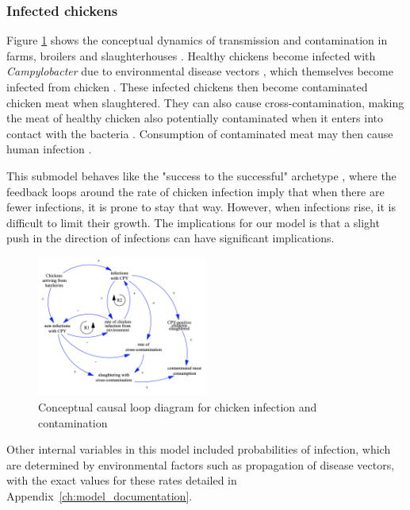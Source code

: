 \subsubsection*{Infected chickens}
Figure \ref{fig:transmission_submodel} shows the conceptual dynamics of transmission and contamination in farms, broilers and slaughterhouses \parencite{rommens_infected_2020}. Healthy chickens become infected with \textit{Campylobacter} due to environmental disease vectors \parencite{royden_role_2016}, which themselves become infected from chicken \parencite{skovgard_retention_2011}. These infected chickens then become contaminated chicken meat when slaughtered. They can also cause cross-contamination, making the meat of healthy chicken also potentially contaminated when it enters into contact with the bacteria \parencite{berndtson_campylobacter_1996}. Consumption of contaminated meat may then cause human infection \parencite{wilson_tracing_2008}.

This submodel behaves like the "success to the successful" archetype \parencite{pruyt_triple_2013}, where the feedback loops around the rate of chicken infection imply that when there are fewer infections, it is prone to stay that way. However, when infections rise, it is difficult to limit their growth. The implications for our model is that a slight push in the direction of infections can have significant implications.

\begin{figure}[h!]
\centering
\includegraphics[width=0.50\textwidth]{images/Transmission submodel.png}
\caption{Conceptual causal loop diagram for chicken infection and contamination}
\label{fig:transmission_submodel}
\end{figure}

Other internal variables in this model included probabilities of infection, which are determined by environmental factors such as propagation of disease vectors, with the exact values for these rates detailed in Appendix~\ref{ch:model_documentation}.


